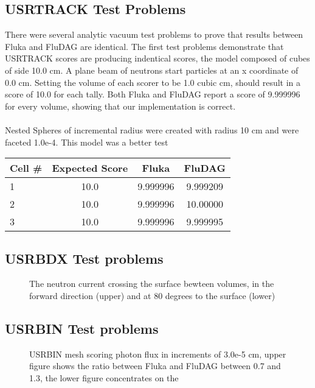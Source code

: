 \documentclass{anstrans}
\begin{document}
\subsection*{USRTRACK Test Problems}
There were several analytic vacuum test problems to prove that results between Fluka and FluDAG are identical. The first test problems demonstrate that USRTRACK scores are producing indentical scores, the model composed of cubes of side 10.0 cm. A plane beam of neutrons start particles at an x coordinate of 0.0 cm. Setting the volume of each scorer to be 1.0 cubic cm, should result in a score of 10.0 for each tally. Both Fluka and FluDAG report a score of 9.999996 for every volume, showing that our implementation 
is correct.
\\
\\
Nested Spheres of incremental radius were created with radius 10 cm and were faceted 1.0e-4. This model was a better test 
\begin{tabular}{l|c|c|c}
Cell \# & Expected Score & Fluka  & FluDAG \\
\hline
1 & 10.0 & 9.999996 & 9.999209 \\
2 & 10.0 & 9.999996 & 10.00000 \\
3 & 10.0 & 9.999996 & 9.999995 \\
\end{tabular}


\subsection*{USRBDX Test problems}
\begin{figure}
	\begin{center}
		\caption{The neutron current crossing the surface bewteen volumes, in the 
		forward direction (upper) and at 80 degrees to the surface (lower)}
	\end{center}
\end{figure}

\subsection*{USRBIN Test problems}
\begin{figure}
	\begin{center}
		\caption{USRBIN mesh scoring photon flux in increments of 3.0e-5 cm, upper figure shows the ratio between Fluka and FluDAG between 0.7 and 1.3, the lower figure concentrates on the }
	\end{center}
\end{figure}
\end{document}
